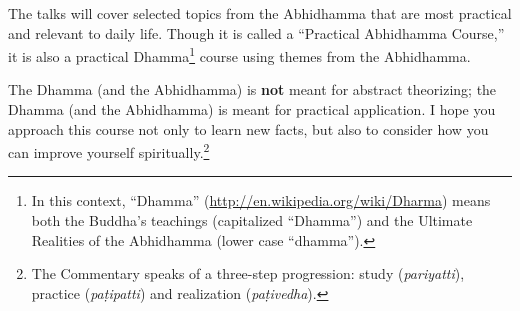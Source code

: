 The talks will cover selected topics from the Abhidhamma that are most practical and relevant to daily life. Though it is called a “Practical Abhidhamma Course,” it is also a practical Dhamma\footnote{In this context, “Dhamma” (\url{http://en.wikipedia.org/wiki/Dharma}) means both the Buddha’s teachings (capitalized “Dhamma”) and the Ultimate Realities of the Abhidhamma (lower case “dhamma”).} course using themes from the Abhidhamma.

The Dhamma (and the Abhidhamma) is \textbf{not} meant for abstract theorizing; the Dhamma (and the Abhidhamma) is meant for practical application. I hope you approach this course not only to learn new facts, but also to consider how you can improve yourself spiritually.\footnote{The Commentary speaks of a three-step progression: study (\textit{pariyatti}), practice (\textit{paṭipatti}) and realization (\textit{paṭivedha}).}